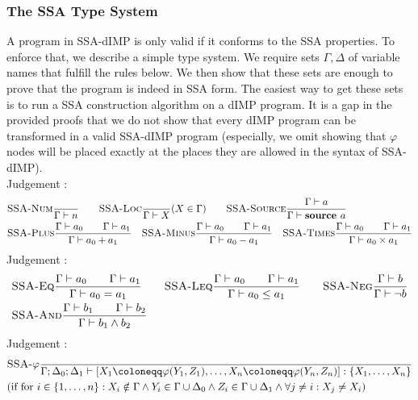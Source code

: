 \subsubsection*{The SSA Type System}
A program in SSA-dIMP is only valid if it conforms to the SSA properties.
To enforce that, we describe a simple type system.
We require sets $\Gamma, \Delta$ of variable names that fulfill the rules below.
We then show that these sets are enough to prove that the program is indeed in SSA form.
The easiest way to get these sets is to run a SSA construction algorithm on a dIMP program.
It is a gap in the provided proofs that we do not show that every dIMP program
can be transformed in a valid SSA-dIMP program (especially, we omit showing that
$\varphi$ nodes will be placed exactly at the places they are allowed in the syntax
of SSA-dIMP).
\\
Judgement :
\begin{align*}
    &\textsc{SSA-Num}\frac{\displaystyle }{\displaystyle \Gamma \vdash {n}}\qquad
    \textsc{SSA-Loc}\frac{\displaystyle }{\displaystyle \Gamma \vdash {X}}\text{($X \in \Gamma$)}\qquad
    \textsc{SSA-Source}\frac{\displaystyle \Gamma \vdash {a}}{\displaystyle \Gamma \vdash {\textbf{source }{a}}}\\
    &\textsc{SSA-Plus}\frac{\displaystyle \Gamma \vdash {a_0}\qquad\Gamma \vdash {a_1}}{\displaystyle \Gamma \vdash {a_0+a_1}}\quad
    \textsc{SSA-Minus}\frac{\displaystyle \Gamma \vdash {a_0}\qquad\Gamma \vdash {a_1}}{\displaystyle \Gamma \vdash {a_0-a_1}}\quad
    \textsc{SSA-Times}\frac{\displaystyle \Gamma \vdash {a_0}\qquad\Gamma \vdash {a_1}}{\displaystyle \Gamma \vdash {a_0 \times a_1}}
\end{align*}
Judgement :
\begin{align*}
    &\textsc{SSA-Eq}\frac{\displaystyle \Gamma \vdash {a_0}\qquad \Gamma \vdash {a_1}}{\displaystyle \Gamma \vdash {a_0 = a_1}}\qquad
    \textsc{SSA-Leq}\frac{\displaystyle \Gamma \vdash {a_0}\qquad \Gamma \vdash {a_1}}{\displaystyle \Gamma \vdash {a_0 \leq a_1}}\qquad
    \textsc{SSA-Neg}\frac{\displaystyle \Gamma \vdash {b}}{\displaystyle \Gamma \vdash {\neg b}}\\
    &\textsc{SSA-And}\frac{\displaystyle \Gamma \vdash {b_1}\qquad\Gamma \vdash {b_2}}{\displaystyle \Gamma \vdash {b_1 \land b_2}}\\
\end{align*}
Judgement :
\begin{align*}
    &\rule{SSA-$\varphi$}{}{\typestep{\Gamma;\Delta_0;\Delta_1}{\defaultphilistn}{\{X_1, \ldots, X_n\}}}\\
    &\text{(if for $i \in \{1, \ldots, n\}: X_i \notin \Gamma \land Y_i \in \Gamma \cup \Delta_0 \land Z_i \in \Gamma \cup \Delta_1
    \land \forall j \neq i: X_j \neq X_i$)}
\end{align*}
